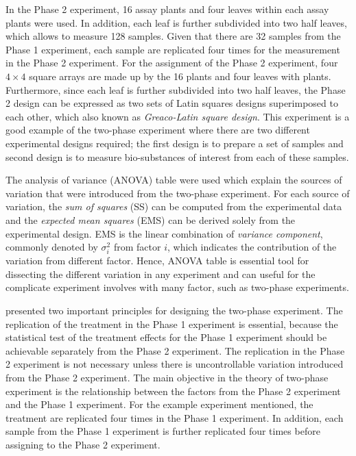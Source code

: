 \documentclass[11pt,a4paper]{article}
\begin{document}
In the Phase 2 experiment, 16 assay plants and four leaves within each assay plants were used. In addition, each leaf is further subdivided into two half leaves, which allows to measure 128 samples. Given that there are 32 samples from the Phase 1 experiment, each sample are replicated four times for the measurement in the Phase 2 experiment. For the assignment of the Phase 2 experiment, four $4 \times 4$ square arrays are made up by the 16 plants and four leaves with plants. Furthermore, since each leaf is further subdivided into two half leaves, the Phase 2 design can be expressed as two sets of Latin squares designs superimposed to each other, which also known as  \emph{Greaco-Latin square design}. This experiment is a good example of the two-phase experiment where there are two different experimental designs required; the first design is to prepare a set of samples and second design is to measure bio-substances of interest from each of these samples. 

The analysis of variance (ANOVA) table were used which explain the sources of variation that were introduced from the two-phase experiment. For each source of variation, the \emph{sum of squares} (SS) can be computed from the experimental data and the \emph{expected mean squares} (EMS) can be derived solely from the experimental design. EMS is the linear combination of \emph{variance component}, commonly denoted by $\sigma_{i}^2$ from factor $i$, which indicates the contribution of the variation from different factor. Hence, ANOVA table is essential tool for dissecting the different variation in any experiment and can useful for the complicate experiment involves with many factor, such as two-phase experiments. 

\cite{McIntyre1955} presented two important principles for designing the two-phase experiment. The replication of the treatment in the Phase 1 experiment is essential, because  the statistical test of the treatment effects for the Phase 1 experiment should be achievable separately from the Phase 2 experiment. The replication in the Phase 2 experiment is not necessary unless there is uncontrollable variation introduced from the Phase 2 experiment. The main objective in the theory of two-phase experiment is the relationship between the factors from the Phase 2 experiment and the Phase 1 experiment. For the example experiment mentioned, the treatment are replicated four times in the Phase 1 experiment. In addition, each sample from the Phase 1 experiment is further replicated four times before assigning to the Phase 2 experiment. 
\end{document}
